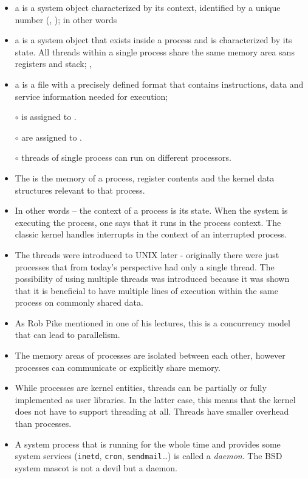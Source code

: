 
\begin{slide}
\begin{itemize}
\item a  is a system object characterized by its context,
identified by a unique number (,
); in other words  
\item a  is a system object that exists inside a process and
is characterized by its state. All threads within a single process share
the same memory area sans registers and stack; ,
\item a  is a file with a precisely defined format that contains
instructions, data and service information needed for execution;
\end{itemize}

\begin{itemize}
\item[$\circ$]  is assigned to . 
\item[$\circ$]  are assigned to .
\item[$\circ$] threads of single process can run on different processors.
\end{itemize}
\end{slide}

\begin{itemize}
\item The  is the memory of a process, register contents and
the kernel data structures relevant to that process.
\item In other words -- the context of a process is its state. When the system
is executing the process, one says that it runs in the process context.
The classic kernel handles interrupts in the context of an interrupted process.
\item The threads were introduced to UNIX later - originally there were just
processes that from today's perspective had only a single thread. The
possibility of using multiple threads was introduced because it was shown that
it is beneficial to have multiple lines of execution within the same process on
commonly shared data.
\item As Rob Pike mentioned in one of his lectures, this is a concurrency model
that can lead to parallelism.
\item The memory areas of processes are isolated between each other, however
processes can communicate or explicitly share memory.
\item While processes are kernel entities, threads can be partially or fully
implemented as user libraries. In the latter case, this means that the kernel
does not have to support threading at all. Threads have smaller overhead than
processes.
\item A system process that is running for the whole time and provides some
system services (\texttt{inetd}, \texttt{cron}, \texttt{sendmail}\dots) is
called a \emph{daemon}. The BSD system mascot is not a devil but a daemon.
\end{itemize}

